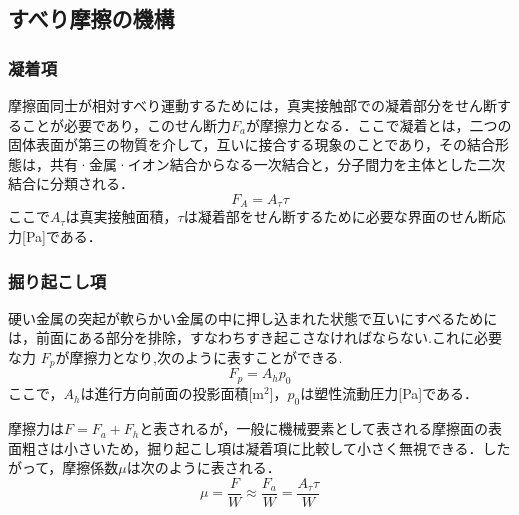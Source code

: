 \subsection{すべり摩擦の機構}

\subsubsection{凝着項}
摩擦面同士が相対すべり運動するためには，真実接触部での凝着部分をせん断することが必要であり，このせん断力$F_a$が摩擦力となる．ここで凝着とは，二つの固体表面が第三の物質を介して，互いに接合する現象のことであり，その結合形態は，共有·金属·イオン結合からなる一次結合と，分子間力を主体とした二次結合に分類される．
\begin{equation}
    \label{eq:せん断力}
    F_A = A_\tau \tau
\end{equation}
ここで$A_\tau$は真実接触面積，$\tau$は凝着部をせん断するために必要な界面のせん断応力[Pa]である．

\subsubsection{掘り起こし項}
硬い金属の突起が軟らかい金属の中に押し込まれた状態で互いにすべるためには，前面にある部分を排除，すなわちすき起こさなければならない.これに必要な力 $F_p$が摩擦力となり,次のように表すことができる.
\begin{equation}
    \label{eq:掘り起こし}
    F_p = A_h p_0
\end{equation}
ここで，$A_h$は進行方向前面の投影面積[$\mathrm{m^2}$]，$p_0$は塑性流動圧力[Pa]である．

摩擦力は$F = F_a + F_h$と表されるが，一般に機械要素として表される摩擦面の表面粗さは小さいため，掘り起こし項は凝着項に比較して小さく無視できる．したがって，摩擦係数$\mu$は次のように表される．
\begin{equation}
    \label{eq:摩擦係数}
    \mu = \frac{F}{W} \approx \frac{F_a}{W} = \frac{A_\tau \tau}{W}
\end{equation}